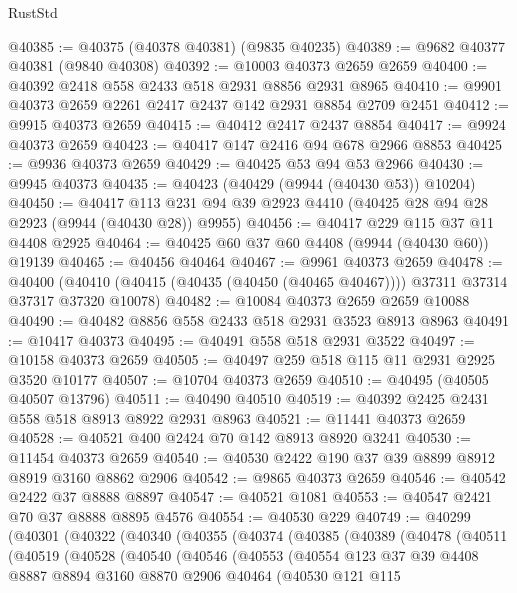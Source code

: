 \begin{lexlean}{RustStd}
\begin{coremodule}
@40385 := @40375 (@40378 @40381) (@9835 @40235)
@40389 := @9682 @40377 @40381 (@9840 @40308)
@40392 := @10003 @40373 @2659 @2659
@40400 := @40392 @2418 @558 @2433 @518 @2931 @8856 @2931 @8965
@40410 := @9901 @40373 @2659 @2261 @2417 @2437 @142 @2931 @8854 @2709 @2451
@40412 := @9915 @40373 @2659
@40415 := @40412 @2417 @2437 @8854
@40417 := @9924 @40373 @2659
@40423 := @40417 @147 @2416 @94 @678 @2966 @8853
@40425 := @9936 @40373 @2659
@40429 := @40425 @53 @94 @53 @2966
@40430 := @9945 @40373
@40435 := @40423 (@40429 (@9944 (@40430 @53)) @10204)
@40450 := @40417 @113 @231 @94 @39 @2923 @4410 (@40425 @28 @94 @28 @2923 (@9944 (@40430 @28)) @9955)
@40456 := @40417 @229 @115 @37 @11 @4408 @2925
@40464 := @40425 @60 @37 @60 @4408 (@9944 (@40430 @60)) @19139
@40465 := @40456 @40464
@40467 := @9961 @40373 @2659
@40478 := @40400
    (@40410 (@40415 (@40435 (@40450 (@40465 @40467)))) @37311 @37314 @37317 @37320 @10078)
@40482 := @10084 @40373 @2659 @2659 @10088
@40490 := @40482 @8856 @558 @2433 @518 @2931 @3523 @8913 @8963
@40491 := @10417 @40373
@40495 := @40491 @558 @518 @2931 @3522
@40497 := @10158 @40373 @2659
@40505 := @40497 @259 @518 @115 @11 @2931 @2925 @3520 @10177
@40507 := @10704 @40373 @2659
@40510 := @40495 (@40505 @40507 @13796)
@40511 := @40490 @40510
@40519 := @40392 @2425 @2431 @558 @518 @8913 @8922 @2931 @8963
@40521 := @11441 @40373 @2659
@40528 := @40521 @400 @2424 @70 @142 @8913 @8920 @3241
@40530 := @11454 @40373 @2659
@40540 := @40530 @2422 @190 @37 @39 @8899 @8912 @8919 @3160 @8862 @2906
@40542 := @9865 @40373 @2659
@40546 := @40542 @2422 @37 @8888 @8897
@40547 := @40521 @1081
@40553 := @40547 @2421 @70 @37 @8888 @8895 @4576
@40554 := @40530 @229
@40749 := @40299
    (@40301
      (@40322
        (@40340
          (@40355
            (@40374
              (@40385
                (@40389
                  (@40478
                    (@40511
                      (@40519
                        (@40528
                          (@40540
                            (@40546
                              (@40553
                                (@40554
                                  @123
                                  @37
                                  @39
                                  @4408
                                  @8887
                                  @8894
                                  @3160
                                  @8870
                                  @2906
                                  @40464
                                  (@40530
                                    @121
                                    @115

\end{coremodule}
\end{lexlean}
